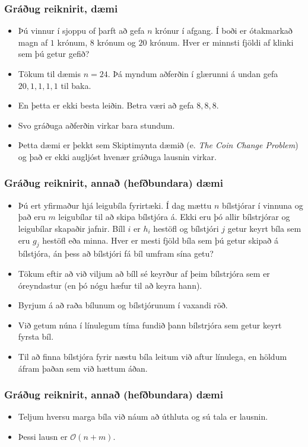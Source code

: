 \documentclass{beamer}
\renewcommand\O{\mathcal{O}}
\begin{document}
\begin{frame}
	\frametitle{Gráðug reiknirit, dæmi}
\begin{itemize}
	\item<1-> 
		Þú vinnur í sjoppu of þarft að gefa $n$ krónur í afgang. 
		Í boði er ótakmarkað magn af $1$ krónum, $8$ krónum og $20$ krónum.
		Hver er minnsti fjöldi af klinki sem þú getur gefið?
	\item<2-> Tökum til dæmis $n = 24$. Þá myndum aðferðin í glærunni á undan gefa $20, 1, 1, 1, 1$ til baka.
	\item<3-> En þetta er ekki besta leiðin. Betra væri að gefa $8, 8, 8$.
	\item<4-> Svo gráðuga aðferðin virkar bara stundum.
	\item<5-> Þetta dæmi er þekkt sem Skiptimynta dæmið (e. \emph{The Coin Change Problem}) og það er ekki augljóst hvenær gráðuga lausnin virkar.
\end{itemize}
\end{frame}

\begin{frame}
	\frametitle{Gráðug reiknirit, annað (hefðbundara) dæmi}
\begin{itemize}
	\item<1-> 
		Þú ert yfirmaður hjá leigubíla fyrirtæki.
		Í dag mættu $n$ bílstjórar í vinnuna og það eru $m$ leigubílar til að skipa bílstjóra á.
		Ekki eru þó allir bílstrjórar og leigubílar skapaðir jafnir.
		Bíll $i$ er $h_i$ hestöfl og bílstjóri $j$ getur keyrt bíla sem eru $g_j$ hestöfl eða minna.
		Hver er mesti fjöld bíla sem þú getur skipað á bílstjóra, án þess að bílstjóri fá bíl umfram sína getu?
	\item<2->  Tökum eftir að við viljum að bíll sé keyrður af þeim bílstrjóra sem er óreyndastur (en þó nógu hæfur til að keyra hann).
	\item<3->  Byrjum á að raða bílunum og bílstjórunum í vaxandi röð.
	\item<4->  Við getum núna í línulegum tíma fundið þann bílstrjóra sem getur keyrt fyrsta bíl.
	\item<5->  Til að finna bílstjóra fyrir næstu bíla leitum við aftur línulega, en höldum áfram þaðan sem við hættum áðan.
\end{itemize}
\end{frame}

\begin{frame}
	\frametitle{Gráðug reiknirit, annað (hefðbundara) dæmi}
\begin{itemize}
	\item<1-> Teljum hversu marga bíla við náum að úthluta og sú tala er lausnin.
	\item<2-> Þessi lausn er $\O(n + m)$.
\end{itemize}
\end{frame}
\end{document}
